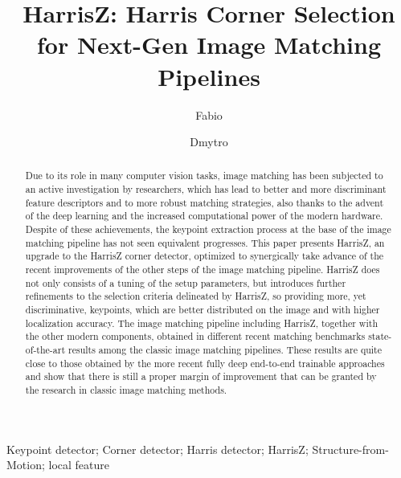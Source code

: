 \documentclass[times,twocolumn,final,authoryear]{elsarticle}
\begin{document}
\ifpreprint
  \setcounter{page}{1}
\else
  \setcounter{page}{1}
\fi

\begin{frontmatter}

\title{HarrisZ: Harris Corner Selection for Next-Gen Image Matching Pipelines}
 
\author[1]{Fabio } 
\author[2]{Dmytro }

\address[1]{Dept. of Mathematics and Computer Science, Universit\`{a} Degli Studi di Palermo, Italy}
\address[2]{Visual Recognition Group, Faculty of Electrical Engineering, CTU in Prague}


\begin{abstract}
Due to its role in many computer vision tasks, image matching has been subjected to an active investigation by researchers, which has lead to better and more discriminant feature descriptors and to more robust matching strategies, also thanks to the advent of the deep learning and the increased computational power of the modern hardware. Despite of these achievements, the keypoint extraction process at the base of the image matching pipeline has not seen equivalent progresses. This paper presents HarrisZ, an upgrade to the HarrisZ corner detector, optimized to synergically take advance of the recent improvements of the other steps of the image matching pipeline. HarrisZ does not only consists of a tuning of the setup parameters, but introduces further refinements to the selection criteria delineated by HarrisZ, so providing more, yet discriminative, keypoints, which are better distributed on the image and with higher localization accuracy. The image matching pipeline including HarrisZ, together with the other modern components, obtained in different recent matching benchmarks state-of-the-art results among the classic image matching pipelines. These results are quite close to those obtained by the more recent fully deep end-to-end trainable approaches and show that there is still a proper margin of improvement that can be granted by the research in classic image matching methods.
\end{abstract}





\begin{keyword}
Keypoint detector; Corner detector; Harris detector; HarrisZ; Structure-from-Motion; local feature
\end{keyword}

\end{frontmatter}
\end{document}

